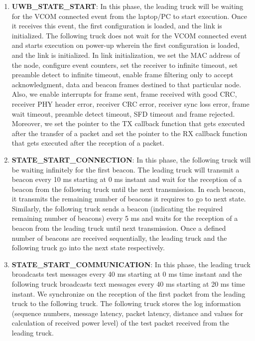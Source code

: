 \begin{enumerate}
    \item \textbf{UWB\_STATE\_START}: In this phase, the leading truck will be waiting for the VCOM connected event from the laptop/PC to start execution. Once it receives this event, the first configuration is loaded, and the link is initialized. The following truck does not wait for the VCOM connected event and starts execution on power-up wherein the first configuration is loaded, and the link is initialized. In link initialization, we set the MAC address of the node, configure event counters, set the receiver to infinite timeout, set preamble detect to infinite timeout, enable frame filtering only to accept acknowledgment, data and beacon frames destined to that particular node. Also, we enable interrupts for frame sent, frame received with good CRC, receiver PHY header error, receiver CRC error, receiver sync loss error, frame wait timeout, preamble detect timeout, SFD timeout and frame rejected. Moreover, we set the pointer to the TX callback function that gets executed after the transfer of a packet and set the pointer to the RX callback function that gets executed after the reception of a packet.
    
    \item \textbf{STATE\_START\_CONNECTION}: In this phase, the following truck will be waiting infinitely for the first beacon. The leading truck will transmit a beacon every 10 ms starting at 0 ms instant and wait for the reception of a beacon from the following truck until the next transmission. In each beacon, it transmits the remaining number of beacons it requires to go to next state. Similarly, the following truck sends a beacon (indicating the required remaining number of beacons) every 5 ms and waits for the reception of a beacon from the leading truck until next transmission. Once a defined number of beacons are received sequentially, the leading truck and the following truck go into the next state respectively.  
    
    \item \textbf{STATE\_START\_COMMUNICATION}: In this phase, the leading truck broadcasts test messages every 40 ms starting at 0 ms time instant and the following truck broadcasts text messages every 40 ms starting at 20 ms time instant. We synchronize on the reception of the first packet from the leading truck to the following truck. The following truck stores the log information (sequence numbers, message latency, packet latency, distance and values for calculation of received power level) of the test packet received from the leading truck.
    

\end{enumerate}
